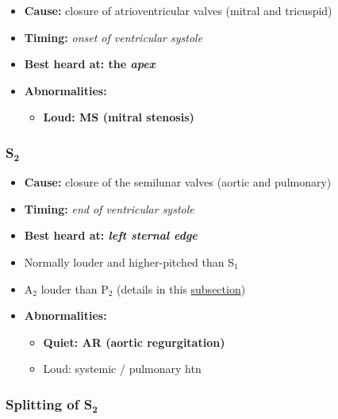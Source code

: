 \documentclass[
  12pt,
]{memoir}
\providecommand{\tightlist}{%
  \setlength{\itemsep}{0pt}\setlength{\parskip}{0pt}}
\begin{document}
\begin{itemize}
\tightlist
\item
  \textbf{Cause:} closure of atrioventricular valves (mitral and
  tricuspid)
\item
  \textbf{Timing:} \emph{onset of ventricular systole}
\item
  \textbf{Best heard at: the \emph{apex}}
\item
  \textbf{Abnormalities:}

  \begin{itemize}
  \tightlist
  \item
    \textbf{Loud: MS (mitral stenosis)}
  \end{itemize}
\end{itemize}

\hypertarget{s_textbf2}{%
\subsubsection{\texorpdfstring{S\(_{\textbf{2}}\)}{S\_\{\textbackslash textbf\{2\}\}}}\label{s_textbf2}}

\begin{itemize}
\tightlist
\item
  \textbf{Cause:} closure of the semilunar valves (aortic and pulmonary)
\item
  \textbf{Timing:} \emph{end of ventricular systole}
\item
  \textbf{Best heard at: \emph{left sternal edge}}
\item
  Normally louder and higher-pitched than S\(_1\)
\item
  A\(_2\) louder than P\(_2\) (details in this \hyperref[sssec:split]
  {subsection})
\item
  \textbf{Abnormalities:}

  \begin{itemize}
  \tightlist
  \item
    \textbf{Quiet: AR (aortic regurgitation)}
  \item
    Loud: systemic / pulmonary htn
  \end{itemize}
\end{itemize}

\hypertarget{splitting-of-s_textbf2}{%
\subsubsection{\texorpdfstring{Splitting of
S\(_{\textbf{2}}\)}{Splitting of S\_\{\textbackslash textbf\{2\}\}}}\label{splitting-of-s_textbf2}}
\end{document}
